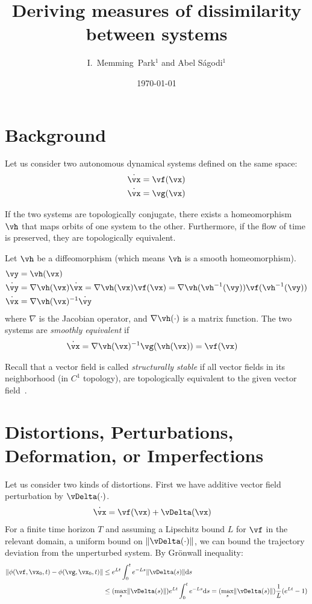 \documentclass[a4paper,twoside]{article}
\title{Deriving measures of dissimilarity between systems}
\author{
I.~Memming~Park$^{1}$ and
Abel S\'agodi$^{1}$
}
\date{\today}
\newcounter{ct}
\DeclarePairedDelimiter{\norm}{\lVert}{\rVert}
\newcommand{\inv}{^{-1}}
\newcommand{\homeo}{\vh}
\newcommand{\invhomeo}{\homeo\inv}
\begin{document}
\maketitle
\thispagestyle{fancy}

\section{Background}
Let us consider two autonomous dynamical systems defined on the same space:
\begin{align}
    \dot{\vx} &= \vf(\vx)
    \\
    \dot{\vx} &= \vg(\vx)
\end{align}

If the two systems are topologically conjugate, there exists a homeomorphism $\homeo$ that maps orbits of one system to the other. Furthermore, if the flow of time is preserved, they are topologically equivalent.

Let $\homeo$ be a diffeomorphism (which means $\homeo$ is a smooth homeomorphism).
\begin{align}
    \vy &= \homeo(\vx)
    \\
    \dot{\vy} &=
	\nabla\homeo(\vx)\dot{\vx}
    =
	\nabla\homeo(\vx) \vf(\vx)
    =
	\nabla\homeo(\invhomeo(\vy)) \vf(\invhomeo(\vy))
    \\
    \dot{\vx} &= \nabla\homeo(\vx)\inv \dot{\vy}
\end{align}
where $\nabla$ is the Jacobian operator, and $\nabla\homeo(\cdot)$ is a matrix function.
The two systems are \emph{smoothly equivalent} if
\begin{align}
    \dot{\vx} &= \nabla\homeo(\vx)\inv \vg(\homeo(\vx)) = \vf(\vx)
\end{align}

Recall that a vector field is called \emph{structurally stable} if all vector fields in its neighborhood (in $C^1$ topology), are topologically equivalent to the given vector field~\cite{Chicone2006}.

\section{Distortions, Perturbations, Deformation, or Imperfections}
Let us consider two kinds of distortions.
First we have additive vector field perturbation by $\vDelta(\cdot)$.
\begin{align}
    \dot{\vx} &= \vf(\vx) + \vDelta(\vx)
\end{align}
For a finite time horizon $T$ and assuming a Lipschitz bound $L$ for $\vf$ in the relevant domain, a uniform bound on $\norm{\vDelta(\cdot)}$, we can bound the trajectory deviation from the unperturbed system.
By Gr\"onwall inequality\cite{Howard2025}:
\begin{align}
    \norm{
	\phi(\vf, \vx_0, t)
	-
	\phi(\vg, \vx_0, t)
    }
    &\leq
	e^{Lt} \int_0^t e^{-Ls} \norm{\vDelta(s)} \mathrm{d}s
\\
    &\leq
	(\max_s \norm{\vDelta(s)}) e^{Lt} \int_0^t e^{-Ls} \mathrm{d}s
    =
	(\max_s \norm{\vDelta(s)}) \frac{1}{L} (e^{Lt} - 1)
\end{align}



\end{document}

